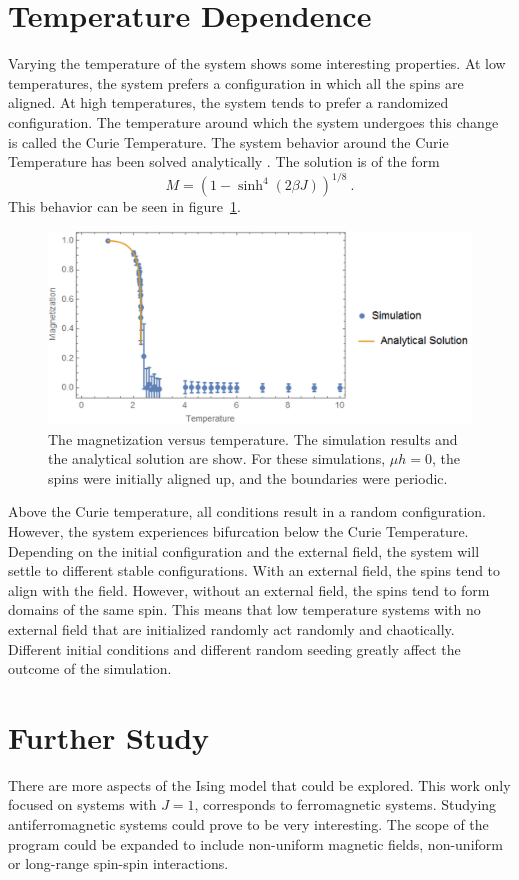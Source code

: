 \documentclass[]{article}
\begin{document}
\section{Temperature Dependence}
Varying the temperature of the system shows some interesting properties.
At low temperatures, the system prefers a configuration in which all the spins are aligned.
At high temperatures, the system tends to prefer a randomized configuration.
The temperature around which the system undergoes this change is called the Curie Temperature.
The system behavior around the Curie Temperature has been solved analytically \cite{osanger1944,montroll1963}.
The solution is of the form
\[
	M = (1-\sinh^{4}(2 \beta J))^{1/8} ~.
\]
This behavior can be seen in figure~\ref{fig:critical}.

\begin{figure}[htb]
	\centering
	\includegraphics[width=\textwidth]{figures/m_v_T.png}
	\caption{The magnetization versus temperature. The simulation results and the analytical solution are show. For these simulations, $\mu h = 0$, the spins were initially aligned up, and the boundaries were periodic.}
	\label{fig:critical}
\end{figure}

Above the Curie temperature, all conditions result in a random configuration.
However, the system experiences bifurcation below the Curie Temperature.
Depending on the initial configuration and the external field, the system will settle to different stable configurations.
With an external field, the spins tend to align with the field.
However, without an external field, the spins tend to form domains of the same spin.
This means that low temperature systems with no external field that are initialized randomly act randomly and chaotically.
Different initial conditions and different random seeding greatly affect the outcome of the simulation.

\section{Further Study}
There are more aspects of the Ising model that could be explored.
This work only focused on systems with $J=1$, corresponds to ferromagnetic systems.
Studying antiferromagnetic systems could prove to be very interesting.
The scope of the program could be expanded to include non-uniform magnetic fields, non-uniform or long-range spin-spin interactions.
\end{document}

